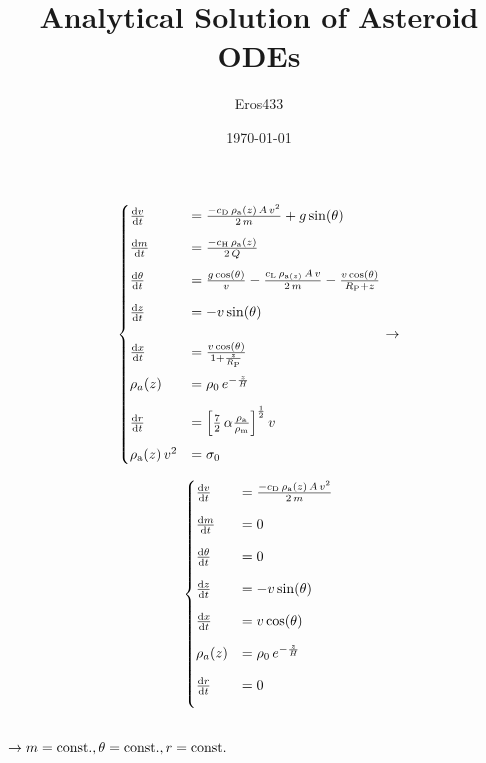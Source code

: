 \documentclass{article}
\title{Analytical Solution of Asteroid ODEs}
\author{Eros433}
\date{\today}
\begin{document}
\maketitle

\noindent\begin{minipage}{.5\linewidth}
\begin{align*}
\begin{cases}
\frac{{\rm d}v}{{\rm d}t}&=\frac{-c_{{\rm D}}\,\rho_{\rm a}(z)\,A\,v^{2}}{2\,m}+g\,{\rm sin}(\theta)\\[0.3cm]
\frac{{\rm d}m}{{\rm d}t}&=\frac{-c_{{\rm H}}\,\rho_{\rm a}(z)}{2\,Q}\\[0.3cm]
\frac{{\rm d}\theta}{{\rm d}t}&=\frac{g\,{\rm cos}(\theta)}{v}-\frac{c_{\rm L}\,\rho_{{\rm a}(z)}\,A\,v}{2\,m}-\frac{v\,{\rm cos}(\theta)}{R_{\rm P}+z}\\[0.3cm]
\frac{{\rm d}z}{{\rm d}t}&=-v\,{\rm sin}(\theta)\\[0.5cm]
\frac{{\rm d}x}{{\rm d}t}&=\frac{v\,{\rm cos}(\theta)}{1+\frac{z}{R_{\rm P}}}\\[0.3cm]
\rho_a(z)&=\rho_0\,e^{-\frac{z}{H}}\\[0.3cm]
\frac{{\rm d}r}{{\rm d}t}&=\left[\frac{7}{2}\,\alpha\frac{\rho_{\rm a}}{\rho_{{\rm m}}}\right]^{\frac{1}{2}}v\\[0.3cm]
\rho_{\rm a}(z)\,v^{\rm 2}&=\sigma_{\rm 0}
\end{cases}
\rightarrow
\end{align*}
\end{minipage}%
\begin{minipage}{.5\linewidth}
\begin{align*}
\begin{cases}
\frac{{\rm d}v}{{\rm d}t}&=\frac{-c_{{\rm D}}\,\rho_{\rm a}(z)\,A\,v^2}{2\,m}\\[0.3cm]
\frac{{\rm d}m}{{\rm d}t}&=0\\[0.3cm]
\frac{{\rm d}\theta}{{\rm d}t}&=0\\[0.3cm]
\frac{{\rm d}z}{{\rm d}t}&=-v\,{\rm sin}(\theta)\\[0.3cm]
\frac{{\rm d}x}{{\rm d}t}&=v\,{\rm cos}(\theta)\\[0.3cm]
\rho_a(z)&=\rho_0\,e^{-\frac{z}{H}}\\[0.3cm]
\frac{{\rm d}r}{{\rm d}t}&=0\\[0.3cm]
\end{cases}
\end{align*}
\end{minipage}
\\[0.5cm]
$\rightarrow m={\rm const.},\theta={\rm const.},r={\rm const.}$\\[0.3cm]
\end{document}

